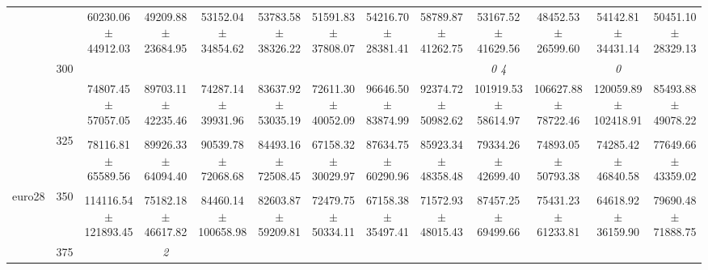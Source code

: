 \begin{table}[h]
{\begin{tabular}{
        ccccccccccccc}
 & & \cellcolor[HTML]{EFEFEF} 60230.06 $\pm$ 44912.03& \cellcolor[HTML]{EFEFEF} 49209.88 $\pm$ 23684.95& \cellcolor[HTML]{EFEFEF} 53152.04 $\pm$ 34854.62& \cellcolor[HTML]{EFEFEF} 53783.58 $\pm$ 38326.22& \cellcolor[HTML]{EFEFEF} 51591.83 $\pm$ 37808.07& \cellcolor[HTML]{EFEFEF} 54216.70 $\pm$ 28381.41& \cellcolor[HTML]{EFEFEF} 58789.87 $\pm$ 41262.75& \cellcolor[HTML]{EFEFEF} 53167.52 $\pm$ 41629.56& \cellcolor[HTML]{EFEFEF} 48452.53 $\pm$ 26599.60& \cellcolor[HTML]{EFEFEF} 54142.81 $\pm$ 34431.14& \cellcolor[HTML]{EFEFEF} 50451.10 $\pm$ 28329.13 \\ 
 & \multirow{2}{*}{300}& & & & & & & & \textit{ 0 4 }& & \textit{ 0 }&  \\ 
 & & 74807.45 $\pm$ 57057.05& 89703.11 $\pm$ 42235.46& 74287.14 $\pm$ 39931.96& 83637.92 $\pm$ 53035.19& 72611.30 $\pm$ 40052.09& 96646.50 $\pm$ 83874.99& 92374.72 $\pm$ 50982.62& 101919.53 $\pm$ 58614.97& 106627.88 $\pm$ 78722.46& 120059.89 $\pm$ 102418.91& 85493.88 $\pm$ 49078.22 \\ 
 & \multirow{2}{*}{325}& \cellcolor[HTML]{EFEFEF} & \cellcolor[HTML]{EFEFEF} & \cellcolor[HTML]{EFEFEF} & \cellcolor[HTML]{EFEFEF} & \cellcolor[HTML]{EFEFEF} & \cellcolor[HTML]{EFEFEF} & \cellcolor[HTML]{EFEFEF} & \cellcolor[HTML]{EFEFEF} & \cellcolor[HTML]{EFEFEF} & \cellcolor[HTML]{EFEFEF} & \cellcolor[HTML]{EFEFEF}  \\ 
 & & \cellcolor[HTML]{EFEFEF} 78116.81 $\pm$ 65589.56& \cellcolor[HTML]{EFEFEF} 89926.33 $\pm$ 64094.40& \cellcolor[HTML]{EFEFEF} 90539.78 $\pm$ 72068.68& \cellcolor[HTML]{EFEFEF} 84493.16 $\pm$ 72508.45& \cellcolor[HTML]{EFEFEF} 67158.32 $\pm$ 30029.97& \cellcolor[HTML]{EFEFEF} 87634.75 $\pm$ 60290.96& \cellcolor[HTML]{EFEFEF} 85923.34 $\pm$ 48358.48& \cellcolor[HTML]{EFEFEF} 79334.26 $\pm$ 42699.40& \cellcolor[HTML]{EFEFEF} 74893.05 $\pm$ 50793.38& \cellcolor[HTML]{EFEFEF} 74285.42 $\pm$ 46840.58& \cellcolor[HTML]{EFEFEF} 77649.66 $\pm$ 43359.02 \\ 
 \multirow{4}{*}{euro28} & \multirow{2}{*}{350}& & & & & & & & & & &  \\ 
 & & 114116.54 $\pm$ 121893.45& 75182.18 $\pm$ 46617.82& 84460.14 $\pm$ 100658.98& 82603.87 $\pm$ 59209.81& 72479.75 $\pm$ 50334.11& 67158.38 $\pm$ 35497.41& 71572.93 $\pm$ 48015.43& 87457.25 $\pm$ 69499.66& 75431.23 $\pm$ 61233.81& 64618.92 $\pm$ 36159.90& 79690.48 $\pm$ 71888.75 \\ 
 & \multirow{2}{*}{375}& \cellcolor[HTML]{EFEFEF} & \cellcolor[HTML]{EFEFEF} \textit{ 2 }& \cellcolor[HTML]{EFEFEF} & \cellcolor[HTML]{EFEFEF} & \cellcolor[HTML]{EFEFEF} & \cellcolor[HTML]{EFEFEF} & \cellcolor[HTML]{EFEFEF} & \cellcolor[HTML]{EFEFEF} & \cellcolor[HTML]{EFEFEF} & \cellcolor[HTML]{EFEFEF} & \cellcolor[HTML]{EFEFEF}  \\ 

\end{tabular}}
\end{table}

